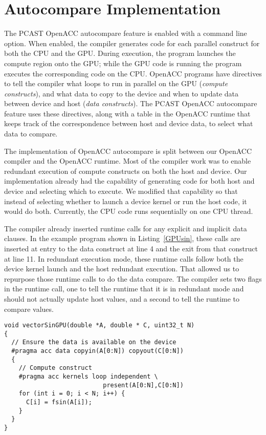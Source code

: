 \section{Autocompare Implementation}

The PCAST OpenACC autocompare feature is enabled with a command line option.
When enabled, the compiler generates code for each parallel construct for both the CPU and the GPU.
During execution, the program launches the compute region onto the GPU; while the GPU code is running the program executes the corresponding code on the CPU.
OpenACC programs have directives to tell the compiler what loops to run in parallel on the GPU (\emph{compute constructs}), and what data to copy to the device and when to update data between device and host (\emph{data constructs}).
The PCAST OpenACC autocompare feature uses these directives, along with a table in the OpenACC runtime that keeps track of the correspondence between host and device data, to select what data to compare.

The implementation of OpenACC autocompare is split between our OpenACC compiler and the OpenACC runtime.
Most of the compiler work was to enable redundant execution of compute constructs on both the host and device.
Our implementation already had the capability of generating code for both host and device and selecting which to execute.
We modified that capability so that instead of selecting whether to launch a device kernel or run the host code, it would do both.
Currently, the CPU code runs sequentially on one CPU thread.

The compiler already inserted runtime calls for any explicit and implicit data clauses.
In the example program shown in Listing~\ref{GPUsin}, these calls are inserted at entry to the data construct at line 4 and the exit from that construct at line 11.
In redundant execution mode, these runtime calls follow both the device kernel launch and the host redundant execution.
That allowed us to repurpose those runtime calls to do the data compare.
The compiler sets two flags in the runtime call, one to tell the runtime that it is in redundant mode and should not actually update host values, and a second to tell the runtime to compare values.
\begin{lstlisting}[caption={Sample OpenACC loop}, label=GPUsin,frame=single,style=Cstyle]
void vectorSinGPU(double *A, double * C, uint32_t N)
{
  // Ensure the data is available on the device
  #pragma acc data copyin(A[0:N]) copyout(C[0:N])
  {
    // Compute construct
    #pragma acc kernels loop independent \
                           present(A[0:N],C[0:N])
    for (int i = 0; i < N; i++) {
      C[i] = fsin(A[i]);
    }
  }
}
\end{lstlisting}

